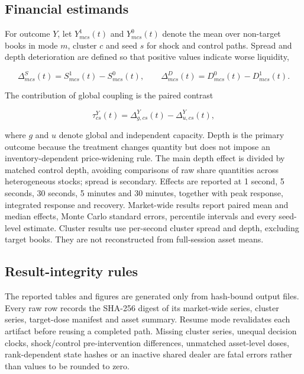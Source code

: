 \subsection{Financial estimands}

For outcome $Y$, let $Y^1_{mcs}(t)$ and $Y^0_{mcs}(t)$ denote the mean over
non-target books in mode $m$, cluster $c$ and seed $s$ for shock and control
paths.  Spread and depth deterioration are defined so that positive values
indicate worse liquidity,

\begin{equation}
  \Delta^S_{mcs}(t)=S^1_{mcs}(t)-S^0_{mcs}(t), \qquad
  \Delta^D_{mcs}(t)=D^0_{mcs}(t)-D^1_{mcs}(t).
\end{equation}

The contribution of global coupling is the paired contrast

\begin{equation}
  \tau^Y_{cs}(t)=\Delta^Y_{g,cs}(t)-\Delta^Y_{u,cs}(t),
\end{equation}

where $g$ and $u$ denote global and independent capacity.  Depth is the
primary outcome because the treatment changes quantity but does not impose an
inventory-dependent price-widening rule.  The main depth effect is divided by
matched control depth, avoiding comparisons of raw share quantities across
heterogeneous stocks; spread is secondary.  Effects are reported at 1 second,
5 seconds, 30 seconds, 5 minutes and 30 minutes, together with peak response,
integrated response and recovery.  Market-wide results report paired mean and
median effects, Monte Carlo standard errors, percentile intervals and every
seed-level estimate.  Cluster results use per-second cluster spread and depth,
excluding target books.  They are not reconstructed from full-session asset
means.

\subsection{Result-integrity rules}

The reported tables and figures are generated only from hash-bound output
files.  Every raw row records the SHA-256 digest of its market-wide series,
cluster series, target-dose manifest and asset summary.  Resume mode revalidates
each artifact before reusing a completed path.  Missing cluster series,
unequal decision clocks, shock/control pre-intervention differences, unmatched
asset-level doses, rank-dependent state hashes or an inactive shared dealer
are fatal errors rather than values to be rounded to zero.

